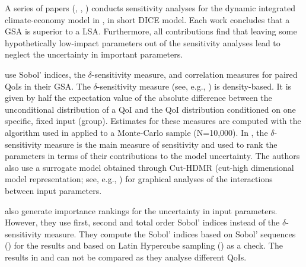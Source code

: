 \newline
A series of papers (\cite{Anderson.2014}, \cite{Butler.2014}, \cite{Miftakhova.2018}) conducts sensitivity analyses for the dynamic integrated climate-economy model in \cite{Nordhaus.2008}, in short DICE model.  Each work concludes that a GSA is superior to a LSA. Furthermore, all contributions find that leaving some hypothetically low-impact parameters out of the sensitivity analyses lead \citeauthor{Nordhaus.2008} to neglect the uncertainty in important parameters.

\cite{Anderson.2014} use Sobol' indices, the $\delta$-sensitivity measure, and correlation measures for paired QoIs in their GSA. The $\delta$-sensitivity measure (see, e.g., \cite{Borgonovo.2006}) is density-based. It is given by half the expectation value of the absolute difference between the unconditional distribution of a QoI and the QoI distribution conditioned on one specific, fixed input (group). Estimates for these measures are computed with the algorithm used in \cite{Plischke.2013} applied to a Monte-Carlo sample (N=10,000). In \cite{Anderson.2014}, the $\delta$-sensitivity measure is the main measure of sensitivity and used to rank the parameters in terms of their contributions to the model uncertainty. The authors also use a surrogate model obtained through Cut-HDMR (cut-high dimensional model representation; see, e.g., \cite{Ziehn.2009}) for graphical analyses of the interactions between input parameters.

\cite{Butler.2014} also generate importance rankings for the uncertainty in input parameters. However, they use first, second and total order Sobol' indices instead of the $\delta$-sensitivity measure. They compute the Sobol' indices based on Sobol' sequences (\cite{Sobol.1967}) for the results and based on Latin Hypercube sampling (\cite{McKay.1979}) as a check. The results in \cite{Butler.2014} and \cite{Anderson.2014} can not be compared as they analyse different QoIs.

